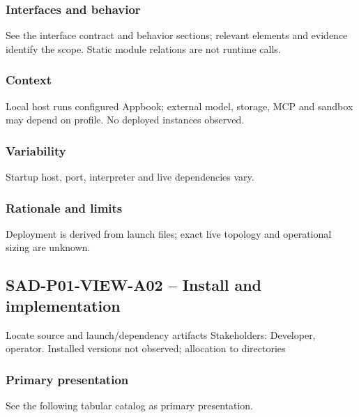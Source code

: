 \documentclass[10pt,letterpaper]{article}
\begin{document}
\subsubsection{Interfaces and behavior}
See the interface contract and behavior sections; relevant elements and evidence identify the scope. Static module relations are not runtime calls.
\subsubsection{Context}
Local host runs configured Appbook; external model, storage, MCP and sandbox may depend on profile. No deployed instances observed.
\subsubsection{Variability}
Startup host, port, interpreter and live dependencies vary.
\subsubsection{Rationale and limits}
Deployment is derived from launch files; exact live topology and operational sizing are unknown.
\subsection{SAD-P01-VIEW-A02 -- Install and implementation}
Locate source and launch/dependency artifacts Stakeholders: Developer, operator. Installed versions not observed; allocation to directories
\subsubsection{Primary presentation}
See the following tabular catalog as primary presentation.
\end{document}
